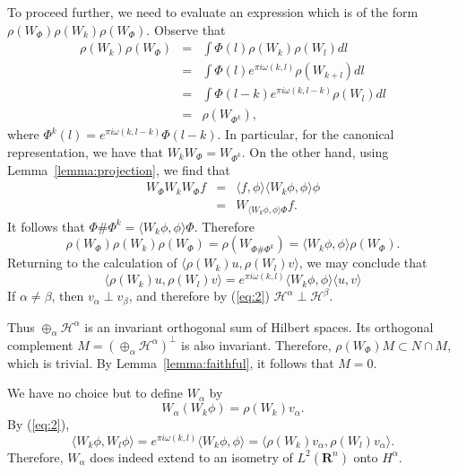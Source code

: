 \documentclass[11pt]{amsart}
\numberwithin{equation}{section}
\theoremstyle{plain}
\theoremstyle{definition}
\newcommand{\Hilb}{\mathcal H}
\newcommand{\R}{\mathbf R}
\begin{document}
To proceed further, we need to evaluate an expression which is of the form $\rho(W_\Phi)\rho(W_k)\rho(W_\Phi)$.
Observe that
\begin{eqnarray*}
  \rho(W_k)\rho(W_\Phi) & = & \int \Phi(l) \rho(W_k) \rho(W_l) d l\\
  & = & \int \Phi(l)e^{\pi i \omega(k,l)}\rho(W_{k+l})d l\\
  & = & \int \Phi(l-k)e^{\pi i\omega(k,l-k)}\rho(W_l)d l\\
  & = & \rho(W_{\Phi^k}),
\end{eqnarray*}
where $\Phi^k(l)=e^{\pi i\omega(k,l-k)}\Phi(l-k)$.
In particular, for the canonical representation, we have that $W_kW_\Phi=W_{\Phi^k}$.
On the other hand,
using Lemma~\ref{lemma:projection}, we find that
\begin{eqnarray*}
  W_\Phi W_k W_\Phi f & = & \langle f, \phi \rangle \langle W_k \phi,\phi\rangle \phi\\
  & = &  W_{\langle W_k\phi,\phi\rangle \Phi}f.
\end{eqnarray*}
It follows that $\Phi\#\Phi^k=\langle W_k\phi,\phi\rangle\Phi$.
Therefore
\begin{equation*}
  \rho(W_\Phi)\rho(W_k)\rho(W_\Phi)=\rho(W_{\Phi\#\Phi^k})=\langle W_k\phi,\phi\rangle\rho(W_\Phi).
\end{equation*}
Returning to the calculation of $\langle \rho(W_k)u,\rho(W_l)v\rangle$, we may conclude that
\begin{equation}
\label{eq:2}
  \langle \rho(W_k)u,\rho(W_l)v\rangle = e^{\pi i \omega(k,l)}\langle W_k\phi,\phi\rangle\langle u,v\rangle 
\end{equation}
If $\alpha\neq \beta$, then $v_\alpha \perp v_\beta$, and therefore by (\ref{eq:2}) $\Hilb^\alpha \perp \Hilb^\beta$.

Thus $\oplus_\alpha \Hilb^\alpha$ is an invariant orthogonal sum of Hilbert spaces.
Its orthogonal complement $M=(\oplus_\alpha \Hilb^\alpha)^\perp$ is also invariant.
Therefore, $\rho(W_\Phi)M \subset N\cap M$, which is trivial.
By Lemma~\ref{lemma:faithful}, it follows that $M=0$.

We have no choice but to define $W_\alpha$ by
\begin{equation*}
  W_\alpha(W_k \phi)=\rho(W_k)v_\alpha.
\end{equation*}
By (\ref{eq:2}),
\begin{equation*}
  \langle W_k\phi, W_l\phi\rangle = e^{\pi i \omega(k,l)}\langle W_k\phi,\phi\rangle = \langle \rho(W_k)v_\alpha,\rho(W_l)v_\alpha\rangle.
\end{equation*}
Therefore, $W_\alpha$ does indeed extend to an isometry of $L^2(\R^n)$ onto $H^\alpha$.
\end{document}
